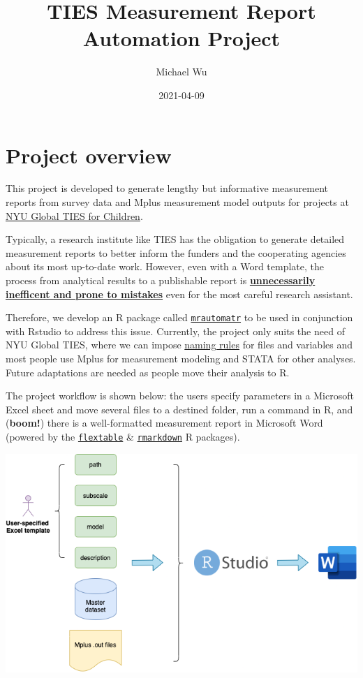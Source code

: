\documentclass[
]{book}
\title{TIES Measurement Report Automation Project}
\author{Michael Wu}
\date{2021-04-09}
\begin{document}
\maketitle

{
\setcounter{tocdepth}{1}
\tableofcontents
}
\hypertarget{project-overview}{%
\chapter{Project overview}\label{project-overview}}

This project is developed to generate lengthy but informative measurement reports from survey data and Mplus measurement model outputs for projects at \href{https://steinhardt.nyu.edu/ihdsc/global-ties}{NYU Global TIES for Children}.

Typically, a research institute like TIES has the obligation to generate detailed measurement reports to better inform the funders and the cooperating agencies about its most up-to-date work. However, even with a Word template, the process from analytical results to a publishable report is \underline{\textbf{unnecessarily inefficent and prone to mistakes}} even for the most careful research assistant.

Therefore, we develop an R package called \href{https://github.com/nyuglobalties/mrautomatr}{\texttt{mrautomatr}} to be used in conjunction with Rstudio to address this issue. Currently, the project only suits the need of NYU Global TIES, where we can impose \href{https://nyu.box.com/s/ate5l7wmw164u7xjg3g8x1vrfhwnt0ax}{naming rules} for files and variables and most people use Mplus for measurement modeling and STATA for other analyses. Future adaptations are needed as people move their analysis to R.

The project workflow is shown below: the users specify parameters in a Microsoft Excel sheet and move several files to a destined folder, run a command in R, and (\textbf{boom!}) there is a well-formatted measurement report in Microsoft Word (powered by the \href{https://davidgohel.github.io/flextable/}{\texttt{flextable}} \& \href{https://bookdown.org/yihui/rmarkdown/}{\texttt{rmarkdown}} R packages).

\begin{center}\includegraphics[width=0.66\linewidth]{images/mrautomatr_diagram} \end{center}
\end{document}
